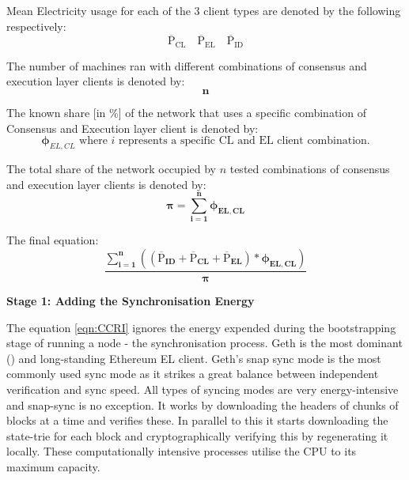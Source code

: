 Mean Electricity usage for each of the 3 client types are denoted by the following respectively: 
\begin{equation*}
  \boldsymbol{\mathrm{{\overline{P}}_{CL}}}\quad      \boldsymbol{\mathrm{{\overline{P}}_{EL}}}\quad  \boldsymbol{\mathrm{{\overline{P}}_{ID}}}   
\end{equation*}

The number of machines ran with different combinations of consensus and execution layer clients is denoted by:
\begin{equation*}
    \boldsymbol{n}
\end{equation*}

The known share [in \%] of the network that uses a specific combination of Consensus and Execution layer client is denoted by:
\begin{equation*}
    \boldsymbol{\phi}_{EL,CL} \text{ where } {i} \text{ represents a specific CL and EL client combination.}
\end{equation*}

The total share of the network occupied by ${n}$ tested combinations of consensus and execution layer clients is denoted by:
\begin{equation*}
    \boldsymbol{{\pi} = \displaystyle\sum\limits_{i=1}^{n}{\phi_{EL,CL}}}
\end{equation*}

The final equation: 
\label{CCRIBaseEqnSection}
\begin{equation}
\boldsymbol{\frac{\displaystyle\sum\limits_{i=1}^{n}{ \left({\left(\mathrm{\overline{P}}_{ID} + \mathrm{\overline{P}}_{CL} + \mathrm{\overline{P}}_{EL}\right)} * {\phi_{EL,CL}} \right)}}
 {\pi}}\label{eqn:CCRI}
\end{equation}



\textbf{Stage 1: Adding the Synchronisation Energy} 

 The equation \ref{eqn:CCRI} ignores the energy expended during the bootstrapping stage of running a node - the synchronisation process. Geth is the most dominant () and long-standing Ethereum EL client. Geth's snap sync mode is the most commonly used sync mode as it strikes a great balance between independent verification and sync speed.
 All types of syncing modes are very energy-intensive and snap-sync is no exception. It works by downloading the headers of chunks of blocks at a time and verifies these. In parallel to this it starts downloading the state-trie for each block and cryptographically verifying this by regenerating it locally. These computationally intensive processes utilise the CPU to its maximum capacity.

